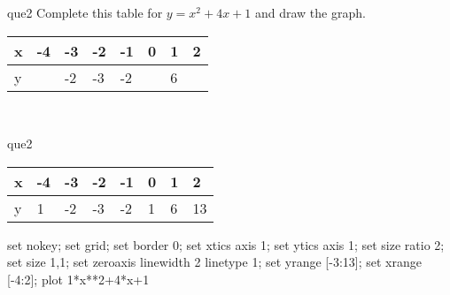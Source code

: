 \documentclass[13.5pt, varwidth=true]{beamer}
\begin{document}
\begin{frame}[shrink=19,fragile]
	\begin{beamercolorbox}[rounded=true, left, shadow=true,wd=14.8cm]{que2}
		 Complete this table for $y = x^{2} + 4x + 1$ and draw the graph. \\[0.3cm] \renewcommand{\arraystretch}{1.2}\begin{tabular}{|C|C|C|C|C|C|C|C|} \hline x & -4 & -3 & -2 & -1 & 0 & 1 & 2 \\ \hline y &  & -2 & -3 & -2 &  & 6 & \\ \hline \end{tabular}\\[0.3cm]
	\end{beamercolorbox}
\end{frame}
\begin{frame}[shrink=19,fragile]
	\begin{beamercolorbox}[rounded=true, left, shadow=true,wd=14.8cm]{que2}
		\renewcommand{\arraystretch}{1.2}\begin{tabular}{|C|C|C|C|C|C|C|C|} \hline x & -4 & -3 & -2 & -1 & 0 & 1 & 2 \\ \hline y & 1 & -2 & -3 & -2 & 1 & 6 & 13\\ \hline \end{tabular}\begin{gnuplot}[terminal=pdf] set nokey; set grid; set border 0; set xtics axis 1; set ytics axis 1; set size ratio 2; set size 1,1; set zeroaxis linewidth 2 linetype 1; set yrange [-3:13]; set xrange [-4:2]; plot 1*x**2+4*x+1 \end{gnuplot}
	\end{beamercolorbox}
\end{frame}
\end{document}
